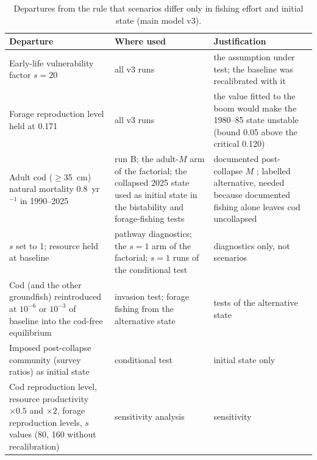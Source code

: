 \documentclass[11pt,letterpaper,fleqn]{article}
\newcommand{\yr}{yr$^{-1}$}
\begin{document}
\begin{table}[p]\caption{Departures from the rule that scenarios differ only in fishing effort and initial state (main model v3).}\label{tab:S-departures}
\small\begin{tabularx}{\textwidth}{@{}p{}p{}L@{}}\toprule
Departure & Where used & Justification\\\midrule
Early-life vulnerability factor $s=20$ & all v3 runs & the assumption under test; the baseline was recalibrated with it\\
Forage reproduction level held at 0.171 & all v3 runs & the value fitted to the boom would make the 1980--85 state unstable (bound 0.05 above the critical 0.120)\\
Adult cod ($\geq$35~cm) natural mortality 0.8~\yr{} in 1990--2025 & run B; the adult-$M$ arm of the factorial; the collapsed 2025 state used as initial state in the bistability and forage-fishing tests & documented post-collapse $M$ \autocite{mohn2012laurentian}; labelled alternative, needed because documented fishing alone leaves cod uncollapsed\\
$s$ set to 1; resource held at baseline & pathway diagnostics; the $s=1$ arm of the factorial; $s=1$ runs of the conditional test & diagnostics only, not scenarios\\
Cod (and the other groundfish) reintroduced at $10^{-6}$ or $10^{-3}$ of baseline into the cod-free equilibrium & invasion test; forage fishing from the alternative state & tests of the alternative state\\
Imposed post-collapse community (survey ratios) as initial state & conditional test & initial state only\\
Cod reproduction level, resource productivity $\times0.5$ and $\times2$, forage reproduction levels, $s$ values (80, 160 without recalibration) & sensitivity analysis & sensitivity\\
\bottomrule\end{tabularx}\end{table}
\end{document}
